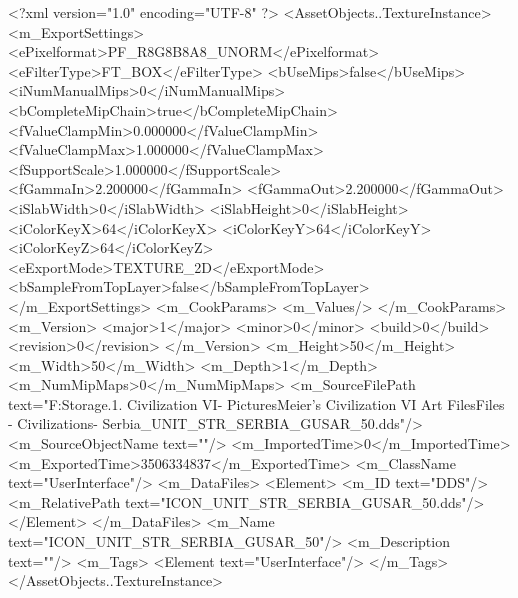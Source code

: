 <?xml version="1.0" encoding="UTF-8" ?>
<AssetObjects..TextureInstance>
	<m_ExportSettings>
		<ePixelformat>PF_R8G8B8A8_UNORM</ePixelformat>
		<eFilterType>FT_BOX</eFilterType>
		<bUseMips>false</bUseMips>
		<iNumManualMips>0</iNumManualMips>
		<bCompleteMipChain>true</bCompleteMipChain>
		<fValueClampMin>0.000000</fValueClampMin>
		<fValueClampMax>1.000000</fValueClampMax>
		<fSupportScale>1.000000</fSupportScale>
		<fGammaIn>2.200000</fGammaIn>
		<fGammaOut>2.200000</fGammaOut>
		<iSlabWidth>0</iSlabWidth>
		<iSlabHeight>0</iSlabHeight>
		<iColorKeyX>64</iColorKeyX>
		<iColorKeyY>64</iColorKeyY>
		<iColorKeyZ>64</iColorKeyZ>
		<eExportMode>TEXTURE_2D</eExportMode>
		<bSampleFromTopLayer>false</bSampleFromTopLayer>
	</m_ExportSettings>
	<m_CookParams>
		<m_Values/>
	</m_CookParams>
	<m_Version>
		<major>1</major>
		<minor>0</minor>
		<build>0</build>
		<revision>0</revision>
	</m_Version>
	<m_Height>50</m_Height>
	<m_Width>50</m_Width>
	<m_Depth>1</m_Depth>
	<m_NumMipMaps>0</m_NumMipMaps>
	<m_SourceFilePath text="F:\Mod Storage\2.1. Civilization VI\Mods\Archive - Pictures\Sid Meier's Civilization VI Art Files\Art Files - Civilizations\Civilization - Serbia\ICON_UNIT_STR_SERBIA_GUSAR_50.dds"/>
	<m_SourceObjectName text=""/>
	<m_ImportedTime>0</m_ImportedTime>
	<m_ExportedTime>3506334837</m_ExportedTime>
	<m_ClassName text="UserInterface"/>
	<m_DataFiles>
		<Element>
			<m_ID text="DDS"/>
			<m_RelativePath text="ICON_UNIT_STR_SERBIA_GUSAR_50.dds"/>
		</Element>
	</m_DataFiles>
	<m_Name text="ICON_UNIT_STR_SERBIA_GUSAR_50"/>
	<m_Description text=""/>
	<m_Tags>
		<Element text="UserInterface"/>
	</m_Tags>
</AssetObjects..TextureInstance>

